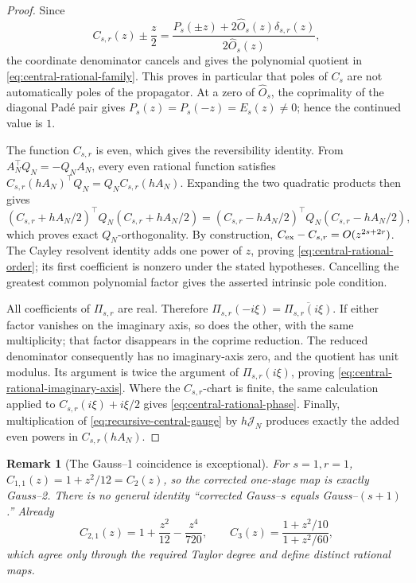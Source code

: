 \documentclass[11pt,a4paper]{article}
\newtheorem{remark}[theorem]{Remark}
\begin{document}
\begin{proof}
Since
\[
 C_{s,r}(z)\mathbin{\pm}\frac z2
 =\frac{P_s(\pm z)+2\widehat O_s(z)\delta_{s,r}(z)}
        {2\widehat O_s(z)},
\]
the coordinate denominator cancels and gives the polynomial quotient in
\cref{eq:central-rational-family}.  This proves in particular that poles
of \(C_s\) are not automatically poles of the propagator.  At a zero of
\(\widehat O_s\), the coprimality of the diagonal Pad\'e pair gives
\(P_s(z)=P_s(-z)=E_s(z)\ne0\); hence the continued value is \(1\).

The function \(C_{s,r}\) is even, which gives the reversibility identity.
From \(A_N^\top Q_N=-Q_NA_N\), every even rational function satisfies
\(C_{s,r}(hA_N)^\top Q_N=Q_NC_{s,r}(hA_N)\).  Expanding the two quadratic
products then gives
\[
 (C_{s,r}+hA_N/2)^\top Q_N(C_{s,r}+hA_N/2)
 =(C_{s,r}-hA_N/2)^\top Q_N(C_{s,r}-hA_N/2),
\]
which proves exact \(Q_N\)-orthogonality.  By construction,
\(C_{\rm ex}-C_{s,r}=O(z^{2s+2r})\).  The Cayley resolvent identity adds
one power of \(z\), proving \cref{eq:central-rational-order}; its first
coefficient is nonzero under the stated hypotheses.  Cancelling the
greatest common polynomial factor gives the asserted intrinsic pole
condition.

All coefficients of \(\Pi_{s,r}\) are real.  Therefore
\(\Pi_{s,r}(-i\xi)=\overline{\Pi_{s,r}(i\xi)}\).  If either factor
vanishes on the imaginary axis, so does the other, with the same
multiplicity; that factor disappears in the coprime reduction.  The
reduced denominator consequently has no imaginary-axis zero, and the
quotient has unit modulus.  Its argument is twice the argument of
\(\Pi_{s,r}(i\xi)\), proving
\cref{eq:central-rational-imaginary-axis}.  Where the \(C_{s,r}\)-chart
is finite, the same calculation applied to
\(C_{s,r}(i\xi)+i\xi/2\) gives
\cref{eq:central-rational-phase}.  Finally, multiplication of
\cref{eq:recursive-central-gauge} by \(h\mathcal J_N\) produces exactly
the added even powers in \(C_{s,r}(hA_N)\).
\end{proof}

\begin{remark}[The Gauss--1 coincidence is exceptional]
\label{rem:gauss-coincidence-exception}
For \(s=1,r=1\), \(C_{1,1}(z)=1+z^2/12=C_2(z)\), so the corrected
one-stage map is exactly Gauss--2.  There is no general identity
``corrected Gauss--\(s\) equals Gauss--\((s+1)\).''  Already
\[
 C_{2,1}(z)=1+\frac{z^2}{12}-\frac{z^4}{720},
 \qquad
 C_3(z)=\frac{1+z^2/10}{1+z^2/60},
\]
which agree only through the required Taylor degree and define distinct
rational maps.
\end{remark}
\end{document}
